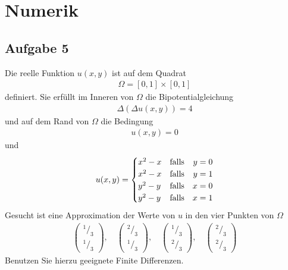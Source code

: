 \documentclass[
	final,
	a4paper,
	oneside,
	parskip=full,
	headings=standardclasses,
	headings=big,
	pointednumbers
]{scrartcl}
\begin{document}
    \section*{Numerik}

    \subsection*{Aufgabe 5}
    Die reelle Funktion $u{\left(x,  y\right)}$ ist auf dem Quadrat
    \begin{align*}
        \Omega = \left[ 0, 1 \right] \times \left[ 0, 1 \right]
    \end{align*}
    definiert. Sie erfüllt im Inneren von $\Omega$ die Bipotentialgleichung
    \begin{align*}
        \Delta{\left( \Delta u{\left(x,  y\right)} \right)} = 4
    \end{align*}
    und auf dem Rand von $\Omega$ die Bedingung
    \begin{align*}
        u{\left(x,  y\right)} = 0
    \end{align*}
    und
    \begin{align*}
        u{\left(x,  y\right)} =
        \setlength{\arraycolsep}{0pt}
        \renewcommand{\arraystretch}{1.2}
        \left\{
            \begin{array}{l @{\quad} l r l}
                x^2-x & \text{falls\quad} & y &{}= 0 \\
                x^2-x & \text{falls\quad} & y &{}= 1 \\
                y^2-y & \text{falls\quad} & x &{}= 0 \\
                y^2-y & \text{falls\quad} & x &{}= 1
            \end{array}
        \right.
    \end{align*}
    Gesucht ist eine Approximation der Werte von $u$ in den vier Punkten von $\Omega$
    \begin{align*}
        \begin{pmatrix}
            {^1/_3} \\ {^1/_3}
        \end{pmatrix},\quad
        \begin{pmatrix}
            {^2/_3} \\ {^1/_3}
        \end{pmatrix},\quad
        \begin{pmatrix}
            {^1/_3} \\ {^2/_3}
        \end{pmatrix},\quad
        \begin{pmatrix}
            {^2/_3} \\ {^2/_3}
        \end{pmatrix}
    \end{align*}
    Benutzen Sie hierzu geeignete Finite Differenzen.
\end{document}
